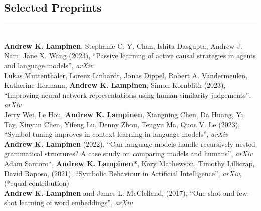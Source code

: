 \documentclass[margin]{res}
\begin{document}
\begin{resume}
\vspace{1pt}\section{Selected\phantom{blah} Preprints} \vspace{-15pt} \rule{\textwidth}{0.5pt} \\[3pt]
\textbf{Andrew K. Lampinen}, Stephanie C. Y. Chan, Ishita Dasgupta, Andrew J. Nam, Jane X. Wang (2023), {``Passive learning of active causal strategies in agents and language models'',} \textit{arXiv} \\[3pt]
Lukas Muttenthaler, Lorenz Linhardt, Jonas Dippel, Robert A. Vandermeulen, Katherine Hermann, \textbf{Andrew K. Lampinen}, Simon Kornblith (2023), {``Improving neural network representations using human similarity judgements'',} \textit{arXiv} \\[3pt]
Jerry Wei, Le Hou, \textbf{Andrew K. Lampinen}, Xiangning Chen, Da Huang, Yi Tay, Xinyun Chen, Yifeng Lu, Denny Zhou, Tengyu Ma, Quoc V. Le (2023), {``Symbol tuning improves in-context learning in language models'',} \textit{arXiv} \\[3pt]
\textbf{Andrew K. Lampinen} (2022), {``Can language models handle recursively nested grammatical structures? A case study on comparing models and humans'',} \textit{arXiv} \\[3pt]
Adam Santoro*, \textbf{Andrew K. Lampinen*}, Kory Mathewson, Timothy Lillicrap, David Raposo, (2021), {``Symbolic Behaviour in Artificial Intelligence'',} \textit{arXiv}, (*equal contribution) \\[3pt] 
\textbf{Andrew K. Lampinen} and James L. McClelland, (2017), {``One-shot and few-shot learning of word embeddings'',} \textit{arXiv} 


\end{resume}
\end{document}
